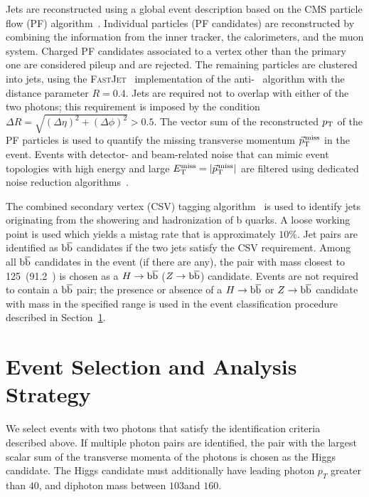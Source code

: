 Jets are reconstructed using a global event description based on the CMS 
particle flow (PF) algorithm~\cite{PF1,PF2}. Individual particles (PF candidates) are reconstructed 
by combining the information from the inner tracker, the calorimeters, and the muon system. 
Charged PF candidates associated to a vertex other than the primary one are considered pileup and are rejected.  
The remaining particles are clustered into jets, using the \textsc{FastJet}~\cite{fastjet} implementation 
of the anti-\kt~\cite{antikt} algorithm with the distance parameter $R=0.4$. Jets are required not to 
overlap with either of the two photons; this requirement is imposed by the condition $\Delta R = \sqrt{(\Delta \eta)^2 + (\Delta \phi)^2}>0.5$. 
The vector sum of the reconstructed $p_{\mathrm{T}}$ of the PF particles is used to quantify 
the missing transverse momentum ${\vec p}_{\mathrm{T}}^{\kern1pt\text{miss}}$ in the event.  Events with detector- and beam-related noise that can mimic 
event topologies with high energy and large $E_{\mathrm{T}}^{\text{miss}} = \left|{\vec p}_{\mathrm{T}}^{\kern1pt\text{miss}}\right|$ are filtered using dedicated 
noise reduction algorithms~\cite{Chatrchyan:2011tn,Chatrchyan:2012lia,Khachatryan:2014gga}.


The combined secondary vertex (CSV) tagging algorithm~\cite{btag8TeV} is used to identify 
jets originating from the showering and hadronization of b quarks. A loose working point is used
which yields a mistag rate that is approximately $10\%$.
Jet pairs are identified as $\mathrm{b}\overline{\mathrm{b}}$ candidates if the two jets satisfy the CSV requirement. 
Among all $\mathrm{b}\overline{\mathrm{b}}$ candidates in the event (if there are any), the pair with mass closest to 125~\GeV (91.2~\GeV)
is chosen as a $H \to \mathrm{b}\overline{\mathrm{b}}$ ($Z \to \mathrm{b}\overline{\mathrm{b}}$) candidate. Events are not required to contain a 
$\mathrm{b}\overline{\mathrm{b}}$ pair; the presence or absence of a $H \to \mathrm{b}\overline{\mathrm{b}}$ or $Z \to \mathrm{b}\overline{\mathrm{b}}$ candidate with mass in the 
specified range is used in the event classification procedure described in Section~\ref{sec:EventSelection}.


\section{Event Selection and Analysis Strategy}\label{sec:EventSelection}


We select events with two photons that satisfy the identification criteria described
above. If multiple photon pairs are identified, the pair with the largest scalar sum of the 
transverse momenta of the photons is chosen as the Higgs candidate. 
The Higgs candidate must additionally have leading photon $p_{T}$ greater than $40$\GeV, 
and diphoton mass between $103$\GeV and $160$\GeV. 


